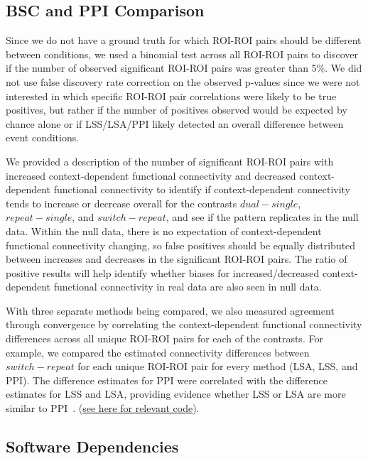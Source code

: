 \documentclass[phd,appendix,figures]{uithesis}
\begin{document}
\subsection*{BSC and PPI Comparison}

Since we do not have a ground truth for which ROI-ROI pairs should be different between conditions,
we used a binomial test across all ROI-ROI pairs to discover if the number of observed significant ROI-ROI pairs was greater
than 5\%.
We did not use false discovery rate correction on the observed p-values since we were not interested in
which specific ROI-ROI pair correlations were likely to be true positives, but rather if the number of positives
observed would be expected by chance alone or if LSS/LSA/PPI likely detected an overall difference between event conditions.

We provided a description of the number of significant ROI-ROI pairs with increased context-dependent functional connectivity and
decreased context-dependent functional connectivity to identify if context-dependent connectivity tends to increase or decrease overall
for the contrasts $dual - single$, $repeat - single$, and $switch - repeat$, and see if the pattern replicates
in the null data. 
Within the null data, there is no expectation of context-dependent functional connectivity changing, so false
positives should be equally distributed between increases and decreases in the significant ROI-ROI pairs.
The ratio of positive results will help identify whether biases for increased/decreased context-dependent functional connectivity
in real data are also seen in null data.

With three separate methods being compared, we also measured agreement through convergence by correlating the
context-dependent functional connectivity differences across all unique ROI-ROI pairs for each of the contrasts.
For example, we compared the estimated connectivity differences between $switch - repeat$ for each unique
ROI-ROI pair for every method (LSA, LSS, and PPI).
The difference estimates for PPI were correlated with the difference estimates for LSS and LSA, providing
evidence whether LSS or LSA are more similar to PPI~\cite{Steiger1980}.
(\href{https://github.com/jdkent/BetaSeriesRealDataAnalysis/blob/2e5d7d2443795133770383daaa401cf70cc03f29/PPITest/compare_bsc_ppi.ipynb}{see here for relevant code}).

\subsection*{Software Dependencies}
\label{methods:software-dependencies2}
\end{document}
